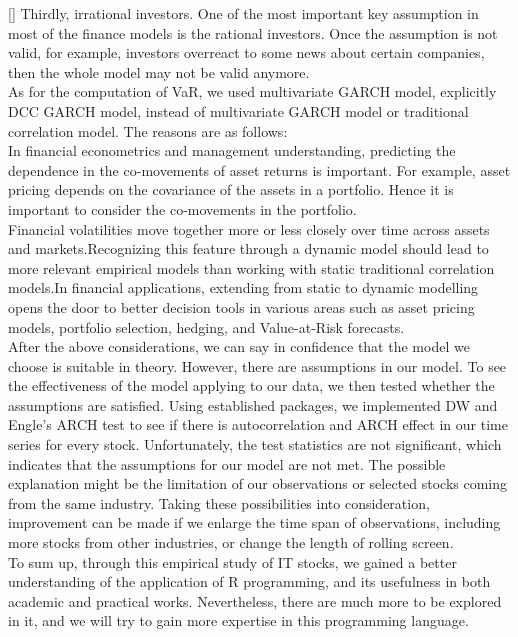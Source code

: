 [\baselineskip] \indent Thirdly, irrational investors. One of the most important key assumption in most of the finance models is the rational investors. Once the assumption is not valid, for example, investors overreact to some news about certain companies, then the whole model may not be valid anymore.\\
[\baselineskip] \indent As for the computation of VaR, we used multivariate GARCH model, explicitly DCC GARCH model, instead of multivariate GARCH model or traditional correlation model. The reasons are as follows:\\
[\baselineskip] \indent In financial econometrics and management understanding, predicting the dependence in the co-movements of asset returns is important. For example, asset pricing depends on the covariance of the assets in a portfolio. Hence it is important to consider the co-movements in the portfolio.\\
Financial volatilities move together more or less closely over time across assets and markets.Recognizing this feature through a dynamic model should lead to more relevant empirical models than working with static traditional correlation models.In financial applications, extending from static to dynamic modelling opens the door to better decision tools in various areas such as asset pricing models, portfolio selection, hedging, and Value-at-Risk forecasts.\\
[\baselineskip] \indent After the above considerations, we can say in confidence that the model we choose is suitable in theory. However, there are assumptions in our model. To see the effectiveness of the model applying to our data, we then tested whether the assumptions are satisfied. Using established packages, we implemented DW and Engle's ARCH test to see if there is autocorrelation and ARCH effect in our time series for every stock. Unfortunately, the test statistics are not significant, which indicates that the assumptions for our model are not met. The possible explanation might be the limitation of our observations or selected stocks coming from the same industry. Taking these possibilities into consideration, improvement can be made if we enlarge the time span of observations, including more stocks from other industries, or change the length of rolling screen.\\
[\baselineskip] \indent To sum up, through this empirical study of IT stocks, we gained a better understanding of the application of R programming, and its usefulness in both academic and practical works. Nevertheless, there are much more to be explored in it, and we will try to gain more expertise in this programming language.\\


